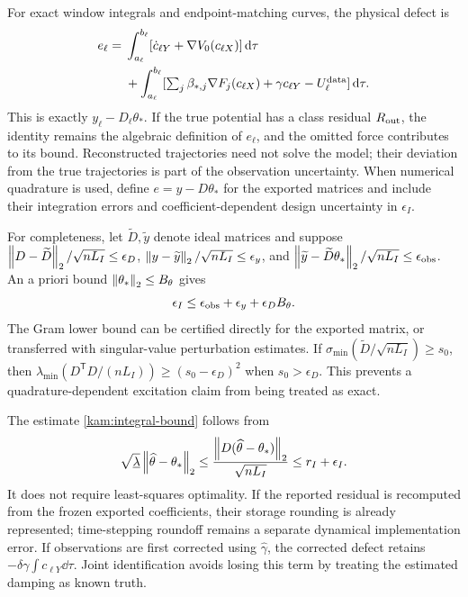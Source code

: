 For exact window integrals and endpoint-matching curves, the physical defect is
\begin{equation}\label{ss:physical-defect}
\begin{aligned}
 e_\ell={}&\int_{a_\ell}^{b_\ell}
 [\dot c_{\ell Y}+\nabla V_0(c_{\ell X})]\,\mathrm d\tau\\
 &+\int_{a_\ell}^{b_\ell}
 [\textstyle\sum_j\beta_{*,j}\nabla F_j(c_{\ell X})
  +\gamma c_{\ell Y}-U_\ell^{\rm data}]\,\mathrm d\tau.
\end{aligned}
\end{equation}
This is exactly $y_\ell-D_\ell\theta_*$. If the true potential has a class residual $R_{\rm out}$, the identity remains the algebraic definition of $e_\ell$, and the omitted force contributes to its bound. Reconstructed trajectories need not solve the model; their deviation from the true trajectories is part of the observation uncertainty. When numerical quadrature is used, define $e=y-D\theta_*$ for the exported matrices and include their integration errors and coefficient-dependent design uncertainty in $\epsilon_I$.

For completeness, let $\widetilde D,\widetilde y$ denote ideal matrices and suppose
$\left\lVert D-\widetilde D\right\rVert_2/\sqrt{nL_I}\le\epsilon_D$,
$\left\lVert y-\widetilde y\right\rVert_2/\sqrt{nL_I}\le\epsilon_y$,
and $\left\lVert\widetilde y-\widetilde D\theta_*\right\rVert_2/\sqrt{nL_I}\le\epsilon_{\rm obs}$. An a priori bound $\left\lVert\theta_*\right\rVert_2\le B_\theta$ gives
\[
 \epsilon_I\le\epsilon_{\rm obs}+\epsilon_y+\epsilon_D B_\theta.
\]
The Gram lower bound can be certified directly for the exported matrix, or transferred with singular-value perturbation estimates. If $\sigma_{\min}(\widetilde D/\sqrt{nL_I})\ge s_0$, then $\lambda_{\min}(D^{\mathsf T}D/(nL_I))\ge(s_0-\epsilon_D)^2$ when $s_0>\epsilon_D$. This prevents a quadrature-dependent excitation claim from being treated as exact.

The estimate \eqref{kam:integral-bound} follows from
\[
 \sqrt{\underline\lambda}\left\lVert\widehat\theta-\theta_*\right\rVert_2
 \le\frac{\left\lVert D(\widehat\theta-\theta_*)\right\rVert_2}{\sqrt{nL_I}}
 \le r_I+\epsilon_I.
\]
It does not require least-squares optimality. If the reported residual is recomputed from the frozen exported coefficients, their storage rounding is already represented; time-stepping roundoff remains a separate dynamical implementation error. If observations are first corrected using $\widehat\gamma$, the corrected defect retains
$-\delta\gamma\int c_{\ell Y}\dd\tau$.
Joint identification avoids losing this term by treating the estimated damping as known truth.

